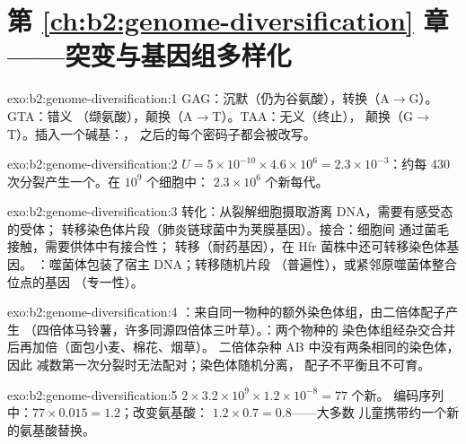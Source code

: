 \section*{第 \ref{ch:b2:genome-diversification} 章——突变与基因组多样化}

\begin{solution}{exo:b2:genome-diversification:1}
GAG：沉默（仍为谷氨酸），转换（A$\to$G）。GTA：错义
（缬氨酸），颠换（A$\to$T）。TAA：无义（终止），
颠换（G$\to$T）。插入一个碱基：，
之后的每个密码子都会被改写。
\end{solution}

\begin{solution}{exo:b2:genome-diversification:2}
$U = 5\times 10^{-10}\times 4.6\times 10^{6} = 2.3\times 10^{-3}$：约每
430 次分裂产生一个。在 $10^{9}$ 个细胞中：
$2.3\times 10^{6}$ 个新每代。
\end{solution}

\begin{solution}{exo:b2:genome-diversification:3}
转化：从裂解细胞摄取游离 DNA，需要有感受态的受体；
转移染色体片段（肺炎链球菌中为荚膜基因）。接合：细胞间
通过菌毛接触，需要供体中有接合性；
转移（耐药基因），在 Hfr 菌株中还可转移染色体基因。
：噬菌体包装了宿主 DNA；转移随机片段
（普遍性），或紧邻原噬菌体整合位点的基因
（专一性）。
\end{solution}

\begin{solution}{exo:b2:genome-diversification:4}
：来自同一物种的额外染色体组，由二倍体配子产生
（四倍体马铃薯，许多同源四倍体三叶草）。：两个物种的
染色体组经杂交合并后再加倍（面包小麦、棉花、烟草）。
二倍体杂种 AB 中没有两条相同的染色体，因此
减数第一次分裂时无法配对；染色体随机分离，
配子不平衡且不可育。
\end{solution}

\begin{solution}{exo:b2:genome-diversification:5}
$2\times 3.2\times 10^{9}\times 1.2\times 10^{-8} = 77$ 个新。
编码序列中：$77\times 0.015 = 1.2$；改变氨基酸：
$1.2\times 0.7 = 0.8$——大多数
儿童携带约一个新的氨基酸替换。
\end{solution}


